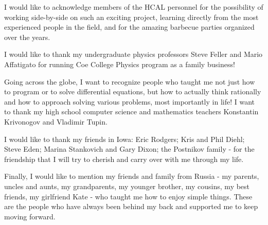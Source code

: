 I would like to acknowledge members of the HCAL personnel for the possibility of working side-by-side on such an exciting project, learning directly from the most experienced people in the field, and for the amazing barbecue parties organized over the years.

I would like to thank my undergraduate physics professors Steve Feller and Mario Affatigato for running Coe College Physics program as a family business!

Going across the globe, I want to recognize people who taught me not just how to program or to solve differential equations, but how to actually think rationally and how to approach solving various problems, most importantly in life! I want to thank my high school computer science and mathematics teachers Konstantin Krivonogov and Vladimir Tupin.

I would like to thank my friends in Iowa: Eric Rodgers; Kris and Phil Diehl; Steve Eden; Marina Stankovich and Gary Dixon; the Postnikov family - for the friendship that I will try to cherish and carry over with me through my life.

Finally, I would like to mention my friends and family from Russia - my parents, uncles and aunts, my grandparents, my younger brother, my cousins, my best friends, my girlfriend Kate - who taught me how to enjoy simple things. These are the people who have always been behind my back and supported me to keep moving forward.